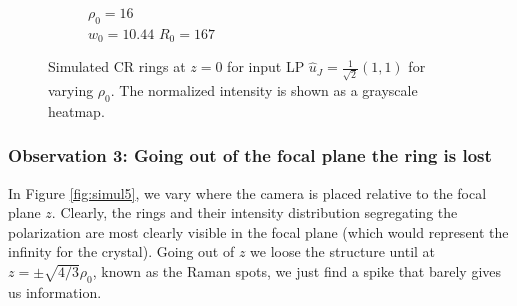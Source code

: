 \documentclass[11pt, a4paper, twoside]{article} %
\begin{document}
\begin{figure}[h!]
\begin{subfigure}[b]{0.245\linewidth}
    \caption{$\rho_0=16$\\ $w_0=10.44$ $R_0=167$}
     \end{subfigure}
    \caption{Simulated CR rings at $z=0$ for input LP $\hat{u}_J=\frac{1}{\sqrt{2}}(1,1)$ for varying $\rho_0$. The normalized intensity is shown as a grayscale heatmap.}
            \label{fig:simul4}
\end{figure}


\subsubsection*{Observation 3: Going out of the focal plane the ring is lost}
In Figure \ref{fig:simul5}, we vary where the camera is placed relative to the focal plane $z$. Clearly, the rings and their intensity distribution segregating the polarization are most clearly visible in the focal plane (which would represent the infinity for the crystal). Going out of $z$ we loose the structure until at $z=\pm\sqrt{4/3}\rho_0$, known as the Raman spots, we just find a spike that barely gives us information.
\end{document}
